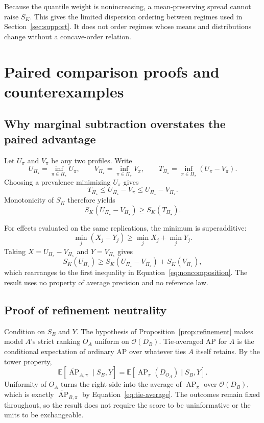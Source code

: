 \documentclass[11pt]{article}
\newcommand{\AP}{\operatorname{AP}}
\newcommand{\PSet}{\Pi_\star}
\newcommand{\E}{\mathbb{E}}
\newcommand{\APta}{\widetilde{\AP}}
\theoremstyle{remark}
\begin{document}
Because the quantile weight is nonincreasing, a mean-preserving spread cannot raise $S_K$. This gives the limited dispersion ordering between regimes used in Section~\ref{sec:support}. It does not order regimes whose means and distributions change without a concave-order relation.

\section{Paired comparison proofs and counterexamples}
\label{app:paired-proofs}

\subsection{Why marginal subtraction overstates the paired advantage}

Let $U_\pi$ and $V_\pi$ be any two profiles. Write
\[
U_{\PSet}=\inf_{\pi\in\PSet}U_\pi,
\qquad
V_{\PSet}=\inf_{\pi\in\PSet}V_\pi,
\qquad
T_{\PSet}=\inf_{\pi\in\PSet}(U_\pi-V_\pi).
\]
Choosing a prevalence minimizing $U_\pi$ gives
\[
T_{\PSet}
\leq
U_{\PSet}-V_\pi
\leq
U_{\PSet}-V_{\PSet}.
\]
Monotonicity of $S_K$ therefore yields
\[
S_K(U_{\PSet}-V_{\PSet})
\geq
S_K(T_{\PSet}).
\]

For effects evaluated on the same replications, the minimum is superadditive:
\[
\min_j(X_j+Y_j)
\geq
\min_jX_j+\min_jY_j.
\]
Taking $X=U_{\PSet}-V_{\PSet}$ and $Y=V_{\PSet}$ gives
\[
S_K(U_{\PSet})
\geq
S_K(U_{\PSet}-V_{\PSet})+S_K(V_{\PSet}),
\]
which rearranges to the first inequality in Equation~\eqref{eq:noncomposition}. The result uses no property of average precision and no reference law.

\subsection{Proof of refinement neutrality}

Condition on $S_B$ and $Y$. The hypothesis of Proposition~\ref{prop:refinement} makes model $A$'s strict ranking $O_A$ uniform on $\mathcal O(D_B)$. Tie-averaged AP for $A$ is the conditional expectation of ordinary AP over whatever ties $A$ itself retains. By the tower property,
\[
\E[\APta_{A,\pi}\mid S_B,Y]
=
\E[\AP_\pi(D_{O_A})\mid S_B,Y].
\]
Uniformity of $O_A$ turns the right side into the average of $\AP_\pi$ over $\mathcal O(D_B)$, which is exactly $\APta_{B,\pi}$ by Equation~\eqref{eq:tie-average}. The outcomes remain fixed throughout, so the result does not require the score to be uninformative or the units to be exchangeable.
\end{document}

